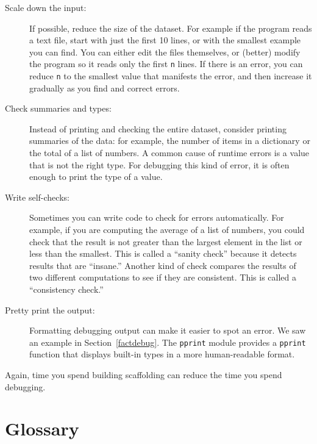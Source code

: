 \begin{description}

\item[Scale down the input:] If possible, reduce the size of the
dataset.  For example if the program reads a text file, start with
just the first 10 lines, or with the smallest example you can find.
You can either edit the files themselves, or (better) modify the
program so it reads only the first {\tt n} lines.
%
If there is an error, you can reduce {\tt n} to the smallest
value that manifests the error, and then increase it gradually
as you find and correct errors.

\item[Check summaries and types:] Instead of printing and checking the
entire dataset, consider printing summaries of the data: for example,
the number of items in a dictionary or the total of a list of numbers.
%
A common cause of runtime errors is a value that is not the right
type.  For debugging this kind of error, it is often enough to print
the type of a value.

\item[Write self-checks:]  Sometimes you can write code to check
for errors automatically.  For example, if you are computing the
average of a list of numbers, you could check that the result is
not greater than the largest element in the list or less than
the smallest.  This is called a ``sanity check'' because it detects
results that are ``insane.''
%
%
Another kind of check compares the results of two different
computations to see if they are consistent.  This is called a
``consistency check.''

\item[Pretty print the output:] {\color{red} Formatting debugging output
can make it easier to spot an error.  We saw an example in
Section~\ref{factdebug}.  The {\tt pprint} module provides
a {\tt pprint} function that displays built-in types in
a more human-readable format.}


\end{description}

Again, time you spend building scaffolding can reduce
the time you spend debugging.


\section{Glossary}
	
